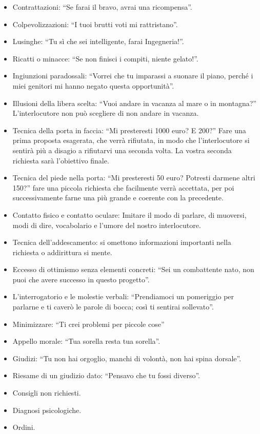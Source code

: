 \documentclass[12pt]{book} %
\begin{document}
\begin{itemize}
\item Contrattazioni: “Se farai il bravo, avrai una ricompensa”. 
\item Colpevolizzazioni: “I tuoi brutti voti mi rattristano”. 
\item Lusinghe: “Tu sì che sei intelligente, farai Ingegneria!”. 
\item Ricatti o minacce: “Se non finisci i compiti, niente gelato!”. 
\item Ingiunzioni paradossali: “Vorrei che tu imparassi a suonare il piano, perché i miei genitori mi hanno negato questa opportunità”. 
\item Illusioni della libera scelta: “Vuoi andare in vacanza al mare o in montagna?” L'interlocutore non può scegliere di non andare in vacanza.
\item Tecnica della porta in faccia: “Mi presteresti 1000 euro? E 200?” Fare una prima proposta esagerata, che verrà rifiutata, in modo che l'interlocutore si sentirà più a disagio a rifiutarvi una seconda volta. La vostra seconda richiesta sarà l'obiettivo finale.
\item Tecnica del piede nella porta: “Mi presteresti 50 euro? Potresti darmene altri 150?” fare una piccola richiesta che facilmente verrà accettata, per poi successivamente farne una più grande e coerente con la precedente.
\item Contatto fisico e contatto oculare: Imitare il modo di parlare, di muoversi, modi di dire, vocabolario e l'umore del nostro interlocutore.
\item Tecnica dell'addescamento: si omettono informazioni importanti nella richiesta o addirittura si mente.
\item Eccesso di ottimismo senza elementi concreti: “Sei un combattente nato, non puoi che avere successo in questo progetto”.
\item L'interrogatorio e le molestie verbali: “Prendiamoci un pomeriggio per parlarne e ti caverò le parole di bocca; così ti sentirai sollevato”. 
\item Minimizzare: “Ti crei problemi per piccole cose”
\item Appello morale: “Tua sorella resta tua sorella”. 
\item Giudizi: “Tu non hai orgoglio, manchi di volontà, non hai spina dorsale”. 
\item Riesame di un giudizio dato: “Pensavo che tu fossi diverso”. 
\item Consigli non richiesti.
\item Diagnosi psicologiche.
\item Ordini.
\end{itemize}
\end{document}
